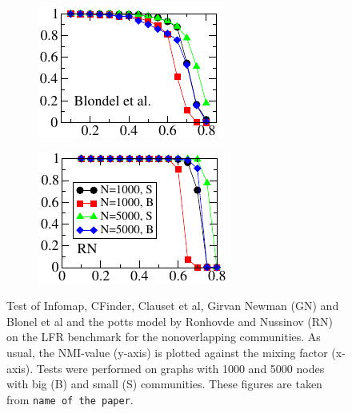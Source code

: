 \begin{figure}
\begin{subfigure}{0.33\textwidth}
    \end{subfigure}%
    \begin{subfigure}{0.33\textwidth}
    \centering
    \includegraphics[width=\foowidth]{lfrpaper/5_split_kropped.pdf}
    \end{subfigure}%
    \begin{subfigure}{0.33\textwidth}
    \centering
    \includegraphics[width=\foowidth]{lfrpaper/6_split_kropped.pdf}
    \end{subfigure}%
    \caption{
        Test of Infomap, CFinder, Clauset et al, Girvan Newman (GN) and Blonel et al 
        and the potts model by Ronhovde and Nussinov (RN) on the LFR benchmark for the nonoverlapping communities. 
        As usual, the NMI-value (y-axis) is plotted against the mixing factor (x-axis).
        Tests were performed on graphs with 1000 and 5000 nodes with big (B) and small (S) communities.
        These figures are taken from \texttt{name of the paper}.
    }
\end{figure}


